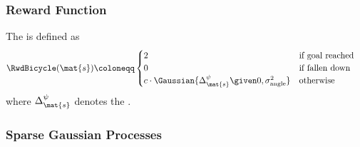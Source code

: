 
\begin{frame}[label=solution_reward]
    \frametitle{Reward Function}

    \begin{definition}
        The  is defined as
        \begin{align}
            \RwdBicycle(\mat{s}) &\coloneqq \begin{cases}
                    2 & \text{if goal reached} \\
                    0 & \text{if fallen down} \\
                    c\cdot\Gaussian{\Delta^\psi_{\mat{s}} \given 0, \sigma_{\text{angle}}^2} & \text{otherwise}
                \end{cases}
        \end{align}
    where $\Delta^\psi_{\mat{s}}$ denotes the .
    \end{definition}
    \vspace{2ex}
    \centering
    
\end{frame}

\begin{frame}[label=gp_sparse]
    \frametitle{Sparse Gaussian Processes}

    \centering
\end{frame}


